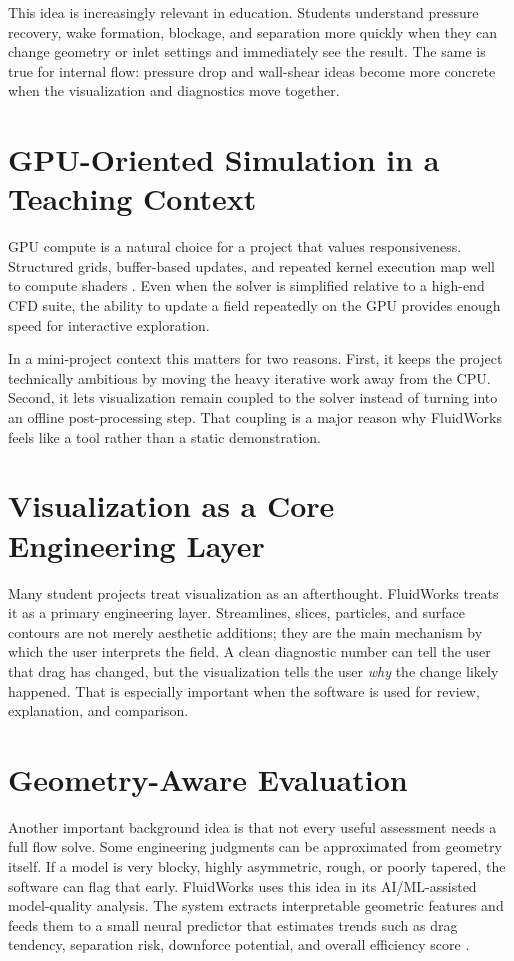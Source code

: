 \documentclass[12pt,a4paper,titlepage]{report}
\begin{document}
This idea is increasingly relevant in education. Students understand pressure recovery, wake formation, blockage, and separation more quickly when they can change geometry or inlet settings and immediately see the result. The same is true for internal flow: pressure drop and wall-shear ideas become more concrete when the visualization and diagnostics move together.

\section{GPU-Oriented Simulation in a Teaching Context}
GPU compute is a natural choice for a project that values responsiveness. Structured grids, buffer-based updates, and repeated kernel execution map well to compute shaders \cite{harris,stam}. Even when the solver is simplified relative to a high-end CFD suite, the ability to update a field repeatedly on the GPU provides enough speed for interactive exploration.

In a mini-project context this matters for two reasons. First, it keeps the project technically ambitious by moving the heavy iterative work away from the CPU. Second, it lets visualization remain coupled to the solver instead of turning into an offline post-processing step. That coupling is a major reason why FluidWorks feels like a tool rather than a static demonstration.

\section{Visualization as a Core Engineering Layer}
Many student projects treat visualization as an afterthought. FluidWorks treats it as a primary engineering layer. Streamlines, slices, particles, and surface contours are not merely aesthetic additions; they are the main mechanism by which the user interprets the field. A clean diagnostic number can tell the user that drag has changed, but the visualization tells the user \textit{why} the change likely happened. That is especially important when the software is used for review, explanation, and comparison.

\section{Geometry-Aware Evaluation}
Another important background idea is that not every useful assessment needs a full flow solve. Some engineering judgments can be approximated from geometry itself. If a model is very blocky, highly asymmetric, rough, or poorly tapered, the software can flag that early. FluidWorks uses this idea in its AI/ML-assisted model-quality analysis. The system extracts interpretable geometric features and feeds them to a small neural predictor that estimates trends such as drag tendency, separation risk, downforce potential, and overall efficiency score \cite{bishop,goodfellow,molnar}.
\end{document}
